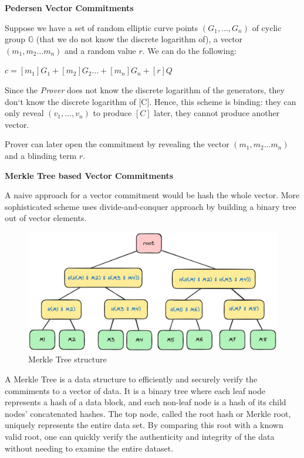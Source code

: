 \documentclass[../lecture-notes.tex]{subfiles}
\begin{document}
\textbf{Pedersen Vector Commitments}

Suppose we have a set of random elliptic curve points $(G_1, \ldots ,G_n)$ of cyclic group $\mathbb{G}$ 
(that we do not know the discrete logarithm of), a vector $(m_1, m_2 \ldots m_n)$ and a random value $r$. We can do the following:

\begin{center}
    $ c = [m_1] G_1 + [m_2] G_2 \ldots + [m_n] G_n + [r] Q$ 
\end{center}

Since the \textit{Prover} does not know the discrete logarithm of the generators, they don`t know the discrete logarithm of [C]. 
Hence, this scheme is binding: they can only reveal $(v_1, \ldots ,v_n)$ to produce $[C]$ later, they cannot produce another vector.

Prover can later open the commitment by revealing the vector $(m_1, m_2 \ldots m_n)$ and a blinding term $r$.

\vspace{0.5 cm}

\textbf{Merkle Tree based Vector Commitments}

A naive approach for a vector commitment would be hash the whole vector. More sophisticated scheme uses divide-and-conquer approach by building a binary tree out of vector elements.

\begin{figure}[H]
    \centering\includegraphics[width=0.9\linewidth, clip]{images/lecture_5/MerkleTree.png}

    \caption{Merkle Tree structure}
\end{figure}

A Merkle Tree is a data structure to efficiently and securely verify the commiments to a vector of data. It is a binary tree where each leaf node represents a hash of a data block, and each non-leaf node is a hash of its child nodes' concatenated hashes. The top node, called the root hash or Merkle root, uniquely represents the entire data set. By comparing this root with a known valid root, one can quickly verify the authenticity and integrity of the data without needing to examine the entire dataset. 
\end{document}

